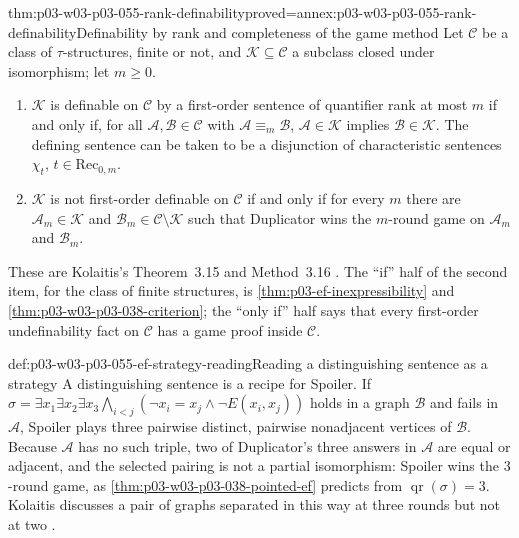 \begin{hbtheorem}{thm:p03-w03-p03-055-rank-definability}{proved=annex:p03-w03-p03-055-rank-definability}{Definability by rank and completeness of the game method}
Let \(\mathcal C\) be a class of \(\tau\)-structures, finite or not, and
\(\mathcal K\subseteq\mathcal C\) a subclass closed under isomorphism; let
\(m\ge0\).
\begin{enumerate}
\item \(\mathcal K\) is definable on \(\mathcal C\) by a first-order
      sentence of quantifier rank at most \(m\) if and only if, for all
      \(\mathcal A,\mathcal B\in\mathcal C\) with
      \(\mathcal A\equiv_m\mathcal B\), \(\mathcal A\in\mathcal K\) implies
      \(\mathcal B\in\mathcal K\). The defining sentence can be taken to be a
      disjunction of characteristic sentences \(\chi_t\),
      \(t\in\mathrm{Rec}_{0,m}\).
\item \(\mathcal K\) is not first-order definable on \(\mathcal C\) if and
      only if for every \(m\) there are \(\mathcal A_m\in\mathcal K\) and
      \(\mathcal B_m\in\mathcal C\setminus\mathcal K\) such that Duplicator
      wins the \(m\)-round game on \(\mathcal A_m\) and \(\mathcal B_m\).
\end{enumerate}
\end{hbtheorem}

These are Kolaitis's Theorem~3.15 and Method~3.16
\cite[pp.~14--15]{Kolaitis2003ExpressivePowerNotes}. The ``if'' half of the
second item, for the class of finite structures, is
\cref{thm:p03-ef-inexpressibility} and
\cref{thm:p03-w03-p03-038-criterion}; the ``only if'' half says that every
first-order undefinability fact on \(\mathcal C\) has a game proof inside
\(\mathcal C\).

\begin{hbexample}{def:p03-w03-p03-055-ef-strategy-reading}{Reading a distinguishing sentence as a strategy}
A distinguishing sentence is a recipe for Spoiler. If
\(\sigma=\exists x_1\exists x_2\exists x_3\bigwedge_{i<j}
(\neg x_i=x_j\wedge\neg E(x_i,x_j))\) holds in a graph \(\mathcal B\) and
fails in \(\mathcal A\), Spoiler plays three pairwise distinct, pairwise
nonadjacent vertices of \(\mathcal B\). Because \(\mathcal A\) has no such
triple, two of Duplicator's three answers in \(\mathcal A\) are equal or
adjacent, and the selected pairing is not a partial isomorphism: Spoiler
wins the \(3\)-round game, as \cref{thm:p03-w03-p03-038-pointed-ef} predicts
from \(\operatorname{qr}(\sigma)=3\). Kolaitis discusses a pair of graphs
separated in this way at three rounds but not at two
\cite[Example~3.3 and Example~3.9, pp.~9--11]{Kolaitis2003ExpressivePowerNotes}.
\end{hbexample}

